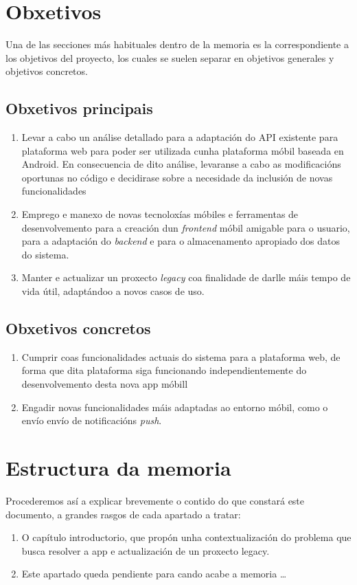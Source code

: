 \section{Obxetivos}
\label{sec:objetivos}
Una de las secciones más habituales dentro de la memoria es la correspondiente a los objetivos del proyecto, los cuales se suelen separar en objetivos generales y objetivos concretos.  

\subsection{Obxetivos principais}
\label{subsec:obxetivos-principais}
\begin{enumerate}[label={\textbf{Objetivo \arabic*:}},leftmargin=2.5cm,labelindent=\parindent]
	\item Levar a cabo un análise detallado para a adaptación do API existente para plataforma web para poder ser utilizada cunha plataforma móbil baseada en Android. En consecuencia de dito análise, levaranse a cabo as modificacións oportunas no código e decidirase sobre a necesidade da inclusión de novas funcionalidades
	\item Emprego e manexo de novas tecnoloxías móbiles e ferramentas de desenvolvemento para a creación dun \textit{frontend} móbil amigable para o usuario, para a adaptación do \textit{backend} e para o almacenamento apropiado dos datos do sistema.
	\item Manter e actualizar un proxecto \textit{legacy} coa finalidade de darlle máis tempo de vida útil, adaptándoo a novos casos de uso.
\end{enumerate}

\subsection{Obxetivos concretos}
\label{subsec:obxetivos-concretos}
\begin{enumerate}[label={\textbf{Objetivo Concreto \arabic*:}},leftmargin=4.5cm,labelindent=\parindent]
	\item Cumprir coas funcionalidades actuais do sistema para a plataforma web, de forma que dita plataforma siga funcionando independientemente do desenvolvemento desta nova app móbill
	\item Engadir novas funcionalidades máis adaptadas ao entorno móbil, como o envío envío de notificacións \textit{push}.
\end{enumerate}


\section{Estructura da memoria}
Procederemos así a explicar brevemente o contido do que constará este documento, a grandes rasgos de cada apartado a tratar:

\begin{enumerate}[label={Capítulo \arabic*},leftmargin=2.5cm]
	\item O capítulo introductorio, que propón unha contextualización do problema que busca resolver a app e actualización de un proxecto legacy.
	\item Este apartado queda pendiente para cando acabe a memoria \ldots
\end{enumerate}
